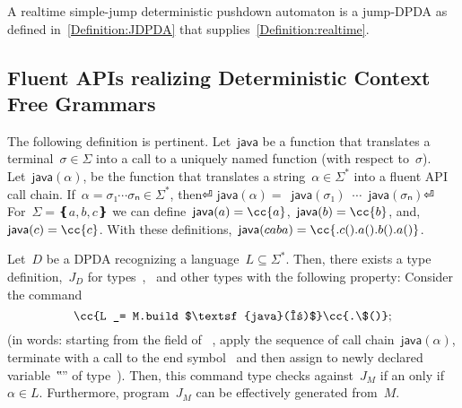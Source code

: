A realtime simple-jump deterministic pushdown automaton is a jump-DPDA
  as defined in~\cref{Definition:JDPDA} 
  that supplies~\cref{Definition:realtime}.
  
\subsection{Fluent APIs realizing Deterministic Context Free Grammars}
The following definition is pertinent.
Let~$\textsf{java}$ be a function that translates a terminal~$σ∈Σ$
into a call to a uniquely named function (with respect to~$σ$).
Let~$\textsf{java}(α)$, be the function
  that translates a string~$α∈Σ^*$ into a fluent API call chain.
If~$α=σ₁⋯σₙ∈Σ^*$, then⏎
  \mbox{\qquad\qquad}$\textsf{java}(α)=$~$\textsf{java}(σ₁)$~$⋯$~$\textsf{java}(σₙ)$\cc{()}⏎
For~$Σ=❴a,b,c❵$ we can define~$\textsf{java}(a)=\cc{a}$,~$\textsf{java}(b)=\cc{b}$, and,~$\textsf{java}(c)=\cc{c}$.
With these definitions,~$\textsf{java}(caba) = \cc{.c().a().b().a()}$.

\begin{theorem}\label{Theorem:Gil-Levy}
  Let~$D$ be a DPDA recognizing a language~$L⊆Σ^*$.
  Then, there exists a \Java type definition,~$J_D$ for types~,~ and other types with the following
  property: Consider the \Java command
  \[
    \cc{L _= M.build $\textsf{java}(α)$}\cc{.\$()};
  \]
  (in words: starting from the  field of ~,
  apply the sequence of call chain~$\textsf{java}(α)$, terminate with a call to the
  end symbol~\cc{\$()} and then assign to newly declared variable~‟\cc{\_}” of type~).
  Then, this command type checks against~$J_M$ if an only if~$α∈L$.
  Furthermore, program~$J_M$ can be effectively generated from~$M$.
\end{theorem}
